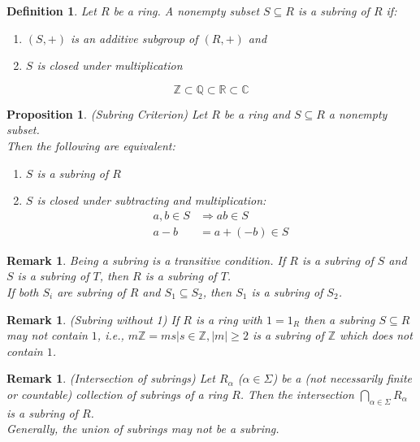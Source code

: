 \documentclass[a4paper,8pt]{article}
\theoremstyle{theorem}
\newtheorem{proposition}[theorem]{Proposition}
\newtheorem{definition}[theorem]{Definition}
\newtheorem{remark}[theorem]{Remark}
\begin{document}
\begin{definition}
Let $R$ be a ring. A nonempty subset $S \subseteq R$ is a \textit{{\color{blue} subring}} of $R$ if:
\begin{enumerate}[label=(\roman*)]
\item $(S, +)$ is an additive subgroup of $(R, +)$ and
\item $S$ is closed under multiplication
\end{enumerate}
\begin{equation}
\mathbb{Z} \subset \mathbb{Q} \subset \mathbb{R} \subset \mathbb{C} \nonumber
\end{equation}
\end{definition}


\begin{proposition}
\textit{{\color{blue} (Subring Criterion)}} Let $R$ be a ring and $S \subseteq R$ a nonempty subset. \\
Then the following are equivalent:
\begin{enumerate}[label=(\roman*)]
\item $S$ is a subring of $R$
\item $S$ is closed under subtracting and multiplication:
\begin{align}
a,b\in S &\Rightarrow ab\in S \nonumber \\
a-b &= a + (-b) \in S \nonumber
\end{align}
\end{enumerate}
\end{proposition}


\begin{remark}
Being a subring is a transitive condition. If $R$ is a subring of $S$ and $S$ is a subring of $T$, then $R$ is a subring of $T$.\\
If both $S_i$ are subring of $R$ and $S_1 \subseteq S_2$, then $S_1$ is a subring of $S_2$.\\
\end{remark}


\begin{remark}
\textit{{\color{blue} (Subring without 1)}} If $R$ is a ring with $1 = 1_R$ then a subring $S \subseteq R$ may not contain $1$, i.e., $m\mathbb{Z} = {ms|s\in \mathbb{Z}, \left| m \right| \geq 2}$ is a subring of $\mathbb{Z}$ which does not contain $1$.
\end{remark}


\begin{remark}
\textit{{\color{blue} (Intersection of subrings)}} Let $R_\alpha$ ($\alpha \in \Sigma$) be a (not necessarily finite or countable) collection of subrings of a ring $R$. Then the intersection $\bigcap\limits_{\alpha \in \Sigma} R_\alpha$ is a subring of $R$.\\
Generally, the union of subrings may not be a subring.\\
\end{remark}
\end{document}

